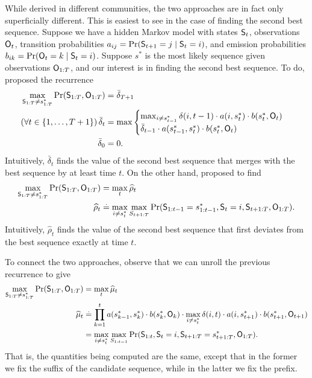 While derived in different communities, the two approaches are in fact only superficially different.
This is easiest to see in the case of finding the second best sequence.
Suppose we have a hidden Markov model with states $\mathsf{S}_{t}$, observations $\mathsf{O}_{t}$, transition probabilities $a_{ij} = \Pr( \mathsf{S}_{t+1} = j \mid \mathsf{S}_t = i )$, and emission probabilities $b_{ik} = \Pr( \mathsf{O}_{t} = k \mid \mathsf{S}_t = i )$.
Suppose $s^*$ is the most likely sequence given observations $\mathsf{O}_{1:T}$,
and our interest is in finding the second best sequence.
To do, \citet{seshadri1994list} proposed the recurrence
\begin{align*}
	\max_{\mathsf{S}_{1:T} \neq s^*_{1 : T}}{\Pr( \mathsf{S}_{1:T}, \mathsf{O}_{1:T} )} &= \bar{\delta}_{T+1} \\
    (\forall t \in \{ 1, \ldots, T + 1 \}) \, \bar{\delta}_t &= 
    \max
    \begin{cases}
    \max_{i \neq s^*_{t-1}} \delta(i, t-1) \cdot a( i, s^*_{t} ) \cdot b( s^*_{t}, \mathsf{O}_{t} ) \\
    \bar{\delta}_{t - 1} \cdot a( s^*_{t - 1}, s^*_{t} ) \cdot b( s^*_{t}, \mathsf{O}_{t} )
    \end{cases} \\
    \bar{\delta}_0 &= 0.
\end{align*}
Intuitively, $\bar{\delta}_t$ finds the value of the second best sequence that merges with the best sequence by at least time $t$.
On the other hand, \citet{nilsson2001sequentially} proposed to find
\begin{align*}
	\max_{\mathsf{S}_{1:T} \neq s^*_{1 : T}}{\Pr( \mathsf{S}_{1:T}, \mathsf{O}_{1:T} )} &= \max_t \widehat{\rho}_t \\
	\widehat{\rho}_{t} &\stackrel{.}{=} \max_{i \neq s^*_{t}} \max_{S_{t+1:T}} {\Pr( \mathsf{S}_{1:t-1} = s^*_{1:t-1}, \mathsf{S}_t = i, \mathsf{S}_{t+1:T}, \mathsf{O}_{1:T} )}.
\end{align*}
Intuitively, $\widehat{\rho}_t$ finds the value of the second best sequence that first deviates from the best sequence exactly at time $t$.

To connect the two approaches, observe that we can unroll the previous recurrence to give
\begin{align*}
	\max_{\mathsf{S}_{1:T} \neq s^*_{1 : T}}{\Pr( \mathsf{S}_{1:T}, \mathsf{O}_{1:T} )} &= \max_t \widehat{\mu}_t \\
	\widehat{\mu}_{t} &\stackrel{.}{=} \prod_{k = 1}^t a( s^*_{k-1}, s^*_{k} ) \cdot b( s^*_{k}, \mathsf{O}_{k} ) \cdot \max_{i \neq s^*_{t}} \delta(i, t) \cdot a( i, s^*_{t+1} ) \cdot b( s^*_{t+1}, \mathsf{O}_{t+1} ) \\
	&= \max_{i \neq s^*_{t}} \max_{S_{1:t-1}} {\Pr( \mathsf{S}_{1:t}, \mathsf{S}_t = i, \mathsf{S}_{t+1:T} = s^*_{t+1:T}, \mathsf{O}_{1:T} )}.
\end{align*}
That is, the quantities being computed are the same, except that in the former we fix the suffix of the candidate sequence, while in the latter we fix the prefix.
